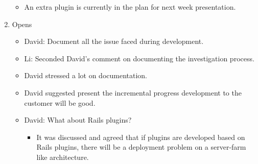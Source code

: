 \documentclass{letter}
\begin{document}
\begin{enumerate}
\begin{itemize}
\begin{itemize}
			\end{itemize}
		\item An extra plugin is currently in the plan for next week presentation.
	\end{itemize}
\item Opens
	\begin{itemize}
		\item David: Document all the issue faced during development. 
		\item Li: Seconded David's comment on documenting the investigation process.
		 \item David stressed a lot on documentation.
		 \item David suggested present the incremental progress development to the customer will be good. 
		 \item David: What about Rails plugins?
		 	\begin{itemize}
				\item It was discussed and agreed that if plugins are developed based on Rails plugins, there will be a deployment problem on a server-farm like architecture. 
			\end{itemize}
	\end{itemize}
\end{enumerate} 
\end{document}
